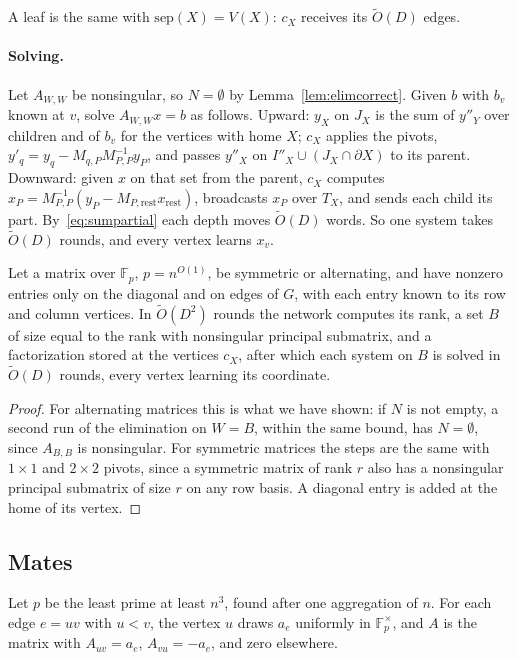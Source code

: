 \documentclass[11pt]{article}
\theoremstyle{definition}
\theoremstyle{remark}
\theoremstyle{plain}
\newenvironment{named}[1]{\def\namedtext{#1}\phantomsection\namedinner}{\endnamedinner}
\newcommand{\Ot}{\tilde O}
\newcommand{\sep}{\mathrm{sep}}
\newcommand{\F}{\mathbb{F}}
\begin{document}
A leaf is the same with $\sep(X)=V(X)$: $c_X$ receives its $\Ot(D)$ edges.

\paragraph{Solving.} Let $A_{W,W}$ be nonsingular, so $N=\emptyset$ by Lemma~\ref{lem:elimcorrect}. Given $b$ with $b_v$ known at $v$, solve $A_{W,W}x=b$ as follows.
Upward: $y_X$ on $J_X$ is the sum of $y''_Y$ over children and of $b_v$ for the vertices with home $X$; $c_X$ applies the pivots,
$y'_q=y_q-M_{q,P}M_{P,P}^{-1}y_P$, and passes $y''_X$ on $I''_X\cup(J_X\cap\partial X)$ to its parent. Downward: given $x$ on that set from the parent, $c_X$
computes $x_P=M_{P,P}^{-1}(y_P-M_{P,\mathrm{rest}}x_{\mathrm{rest}})$, broadcasts $x_P$ over $T_X$, and sends each child its part. By~\eqref{eq:sumpartial} each depth
moves $\Ot(D)$ words. So one system takes $\Ot(D)$ rounds, and every vertex learns $x_v$.

\begin{named}{Linear Algebra Lemma}\label{lem:la}
Let a matrix over $\F_p$, $p=n^{O(1)}$, be symmetric or alternating, and have nonzero entries only on the diagonal and on edges of $G$, with each entry known to
its row and column vertices. In $\Ot(D^2)$ rounds the network computes its rank, a set $B$ of size equal to the rank with nonsingular principal submatrix, and
a factorization stored at the vertices $c_X$, after which each system on $B$ is solved in $\Ot(D)$ rounds, every vertex learning its coordinate.
\end{named}
\begin{proof}
For alternating matrices this is what we have shown: if $N$ is not empty, a second run of the elimination on $W=B$, within the same bound, has $N=\emptyset$, since
$A_{B,B}$ is nonsingular. For symmetric matrices the steps are the same with $1\times1$ and $2\times2$ pivots, since a symmetric matrix of rank $r$ also has a
nonsingular principal submatrix of size $r$ on any row basis. A diagonal entry is added at the home of its vertex.
\end{proof}

\subsection{Mates}

Let $p$ be the least prime at least $n^3$, found after one aggregation of $n$. For each edge $e=uv$ with $u<v$, the vertex $u$ draws $a_e$ uniformly in $\F_p^\times$, and $A$ is
the matrix with $A_{uv}=a_e$, $A_{vu}=-a_e$, and zero elsewhere.
\end{document}
